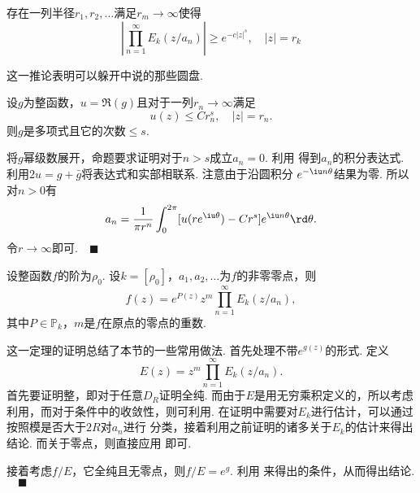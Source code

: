   \begin{cor}
    \label{cor: prod E_k的估计}
    存在一列半径$r_1,r_2,\dots$满足$r_m\to\infty$使得
    \[
      \left| \prod_{n=1}^\infty E_k(z/a_n) \right|\ge e^{-c|z|^s},
      \quad |z|=r_k
    \]
  \end{cor}
  \remark
    这一推论表明可以躲开中说的那些圆盘. 

  \begin{lemma}
    \label{lemma: 实部、整函数、多项式}
    设$g$为整函数，$u=\Re(g)$且对于一列$r_n\to\infty$满足
    \[
      u(z) \le Cr_n^s,\quad |z|=r_n.
    \]
    则$g$是多项式且它的次数$\le s$.
  \end{lemma}
  \proof
    将$g$幂级数展开，命题要求证明对于$n>s$成立$a_n=0$. 利用
    得到$a_n$的积分表达式. 利用$2u=g+\bar{g}$将表达式和实部相联系. 注意由于沿圆积分
    $e^{-\iu n\theta}$结果为零. 所以对$n>0$有
    \[
      a_n = \frac{1}{\pi r^n}\int_0^{2\pi}[u(re^{\iu\theta})-Cr^s]
      e^{\iu n\theta}\rd\theta.
    \]
    令$r\to\infty$即可.$\quad\blacksquare$

  \begin{thm}[Hadamard分解定理]
    设整函数$f$的阶为$\rho_0$. 设$k=[\rho_0]$，$a_1,a_2,\dots$为$f$的非零零点，则
    \[
      f(z) = e^{P(z)}z^m\prod_{n=1}^\infty E_k(z/a_n),
    \]
    其中$P\in\mathbb{P}_k$，$m$是$f$在原点的零点的重数.
  \end{thm}
  \proof
    这一定理的证明总结了本节的一些常用做法. 首先处理不带$e^{g(z)}$的形式. 定义
    \[
      E(z) = z^m\prod_{n=1}^\infty E_k(z/a_n).
    \]
    首先要证明整，即对于任意$D_R$证明全纯. 而由于$E$是用无穷乘积定义的，所以考虑
    利用，而对于条件中的收敛性，则可利用. 在证明中需要对$E_k$进行估计，可以通过按照模是否大于$2R$对$a_n$进行
    分类，接着利用之前证明的诸多关于$E_k$的估计来得出结论. 而关于零点，则直接应用
    即可.\par
    接着考虑$f/E$，它全纯且无零点，则$f/E=e^g$. 利用
    来得出的条件，从而得出结论.$\quad\blacksquare$


